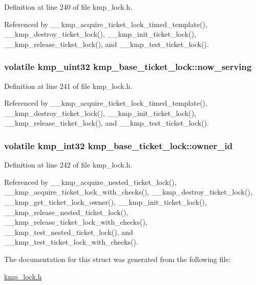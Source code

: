 Definition at line 240 of file kmp\-\_\-lock.\-h.



Referenced by \-\_\-\-\_\-kmp\-\_\-acquire\-\_\-ticket\-\_\-lock\-\_\-timed\-\_\-template(), \-\_\-\-\_\-kmp\-\_\-destroy\-\_\-ticket\-\_\-lock(), \-\_\-\-\_\-kmp\-\_\-init\-\_\-ticket\-\_\-lock(), \-\_\-\-\_\-kmp\-\_\-release\-\_\-ticket\-\_\-lock(), and \-\_\-\-\_\-kmp\-\_\-test\-\_\-ticket\-\_\-lock().

\hypertarget{structkmp__base__ticket__lock_af2e1b640be5026e8bbe7b1ed7d1b341e}{
\subsubsection[{now\-\_\-serving}]{\setlength{\rightskip}{0pt plus 5cm}volatile kmp\-\_\-uint32 kmp\-\_\-base\-\_\-ticket\-\_\-lock\-::now\-\_\-serving}}\label{structkmp__base__ticket__lock_af2e1b640be5026e8bbe7b1ed7d1b341e}


Definition at line 241 of file kmp\-\_\-lock.\-h.



Referenced by \-\_\-\-\_\-kmp\-\_\-acquire\-\_\-ticket\-\_\-lock\-\_\-timed\-\_\-template(), \-\_\-\-\_\-kmp\-\_\-destroy\-\_\-ticket\-\_\-lock(), \-\_\-\-\_\-kmp\-\_\-init\-\_\-ticket\-\_\-lock(), \-\_\-\-\_\-kmp\-\_\-release\-\_\-ticket\-\_\-lock(), and \-\_\-\-\_\-kmp\-\_\-test\-\_\-ticket\-\_\-lock().

\hypertarget{structkmp__base__ticket__lock_a24b62af42d72540c62cfbca970895539}{
\subsubsection[{owner\-\_\-id}]{\setlength{\rightskip}{0pt plus 5cm}volatile kmp\-\_\-int32 kmp\-\_\-base\-\_\-ticket\-\_\-lock\-::owner\-\_\-id}}\label{structkmp__base__ticket__lock_a24b62af42d72540c62cfbca970895539}


Definition at line 242 of file kmp\-\_\-lock.\-h.



Referenced by \-\_\-\-\_\-kmp\-\_\-acquire\-\_\-nested\-\_\-ticket\-\_\-lock(), \-\_\-\-\_\-kmp\-\_\-acquire\-\_\-ticket\-\_\-lock\-\_\-with\-\_\-checks(), \-\_\-\-\_\-kmp\-\_\-destroy\-\_\-ticket\-\_\-lock(), \-\_\-\-\_\-kmp\-\_\-get\-\_\-ticket\-\_\-lock\-\_\-owner(), \-\_\-\-\_\-kmp\-\_\-init\-\_\-ticket\-\_\-lock(), \-\_\-\-\_\-kmp\-\_\-release\-\_\-nested\-\_\-ticket\-\_\-lock(), \-\_\-\-\_\-kmp\-\_\-release\-\_\-ticket\-\_\-lock\-\_\-with\-\_\-checks(), \-\_\-\-\_\-kmp\-\_\-test\-\_\-nested\-\_\-ticket\-\_\-lock(), and \-\_\-\-\_\-kmp\-\_\-test\-\_\-ticket\-\_\-lock\-\_\-with\-\_\-checks().



The documentation for this struct was generated from the following file\-:\begin{DoxyCompactItemize}
\item 
\hyperlink{kmp__lock_8h}{kmp\-\_\-lock.\-h}\end{DoxyCompactItemize}
